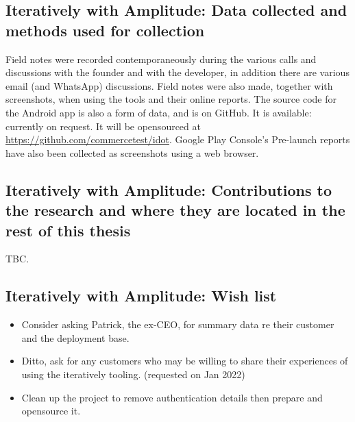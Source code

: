 \subsection{Iteratively with Amplitude: Data collected and methods used for collection}
Field notes were recorded contemporaneously during the various calls and discussions with the founder and with the developer, in addition there are various email (and WhatsApp) discussions. Field notes were also made, together with screenshots, when using the tools and their online reports. The source code for the Android app is also a form of data, and is on GitHub. It is available: currently on request. It will be opensourced at \url{https://github.com/commercetest/idot}. Google Play Console's Pre-launch reports have also been collected as screenshots using a web browser.

\subsection{Iteratively with Amplitude: Contributions to the research and where they are located in the rest of this thesis}
TBC.

\subsection*{Iteratively with Amplitude: Wish list}
{\small
\begin{itemize}
    \item Consider asking Patrick, the ex-CEO, for summary data re their customer and the deployment base. 
    \item Ditto, ask for any customers who may be willing to share their experiences of using the iteratively tooling. (requested on  Jan 2022)
    \item Clean up the project to remove authentication details then prepare and opensource it.
\end{itemize}
}

\clearpage


